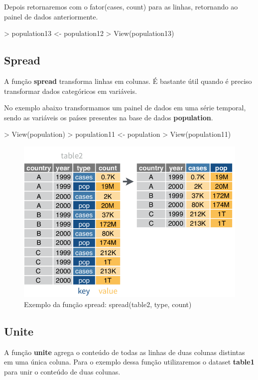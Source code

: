 \documentclass[12pt,a4paper,oneside]{erdc}
\begin{document}
Depois retornaremos com o fator(cases, count) para as linhas, retornando ao painel de dados anteriormente.

\begin{Schunk}
\begin{Sinput}
> population13 <- population12 %
> View(population13)
\end{Sinput}
\end{Schunk}
	

\subsection{Spread}
A função \textbf{spread} transforma linhas em colunas. É bastante útil quando é preciso transformar dados categóricos em variáveis.

No exemplo abaixo transformamos um painel de dados em uma série temporal, sendo as variáveis os países presentes na base de dados \textbf{population}.

\begin{Schunk}
\begin{Sinput}
> View(population)
> population11 <- population %
> View(population11)
\end{Sinput}
\end{Schunk}


	
\begin{figure}[htpb]
	\centering
	\includegraphics[width=.6\linewidth]{../figs/BP_Curso_TecComp_00_2019_f03-05.png}
	\caption{Exemplo da função spread: spread(table2, type, count)}
	\label{fig:bpcursoteccomp002019f03-05}
\end{figure}


\newpage
\subsection{Unite}

A função \textbf{unite} agrega o conteúdo de todas as linhas de duas colunas distintas em uma única coluna. Para o exemplo dessa função utilizaremos o dataset \textbf{table1} para unir o conteúdo de duas colunas.
\end{document}
